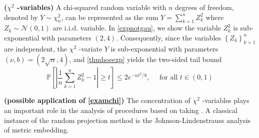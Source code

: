 \documentclass{article}
\newcommand{\bfs}[1]{\textbf{({#1})}}
\begin{document}
\begin{exma}{\bfs{$\chi^{2}$ -variables}}\label{examchi}
     A chi-squared random variable with $n$ degrees of freedom, denoted by $Y \sim \chi_{n}^{2}$, can be represented as the sum $Y=\sum_{k=1}^{n} Z_{k}^{2}$ where $Z_{k} \sim \mathcal{N}(0,1)$ are i.i.d. variable. In \cref{expnotgau}, we show the variable $Z_{k}^{2}$ is sub-exponential with parameters $(2,4) .$ Consequently, since the variables $\left\{Z_{k}\right\}_{k=1}^{n}$ are independent, the $\chi^{2}$ -variate $Y$ is sub-exponential with parameters $(\nu, b)=(2 \sqrt{n}, 4)$, and \cref{thmhoeexp} yields the two-sided tail bound
$$
\mathbb{P}\left[\left|\frac{1}{n} \sum_{k=1}^{n} Z_{k}^{2}-1\right| \geq t\right] \leq 2 e^{-n t^{2} / 8}, \quad \text { for all } t \in(0,1)
$$
\end{exma} 
\begin{rema}{\bfs{possible application of \cref{examchi}}}
 The concentration of $\chi^{2}$ -variables plays an important role in the analysis of procedures based on taking . A classical instance of the random projection method is the Johnson-Lindenstrauss analysis of metric embedding.
\end{rema}
\end{document}
